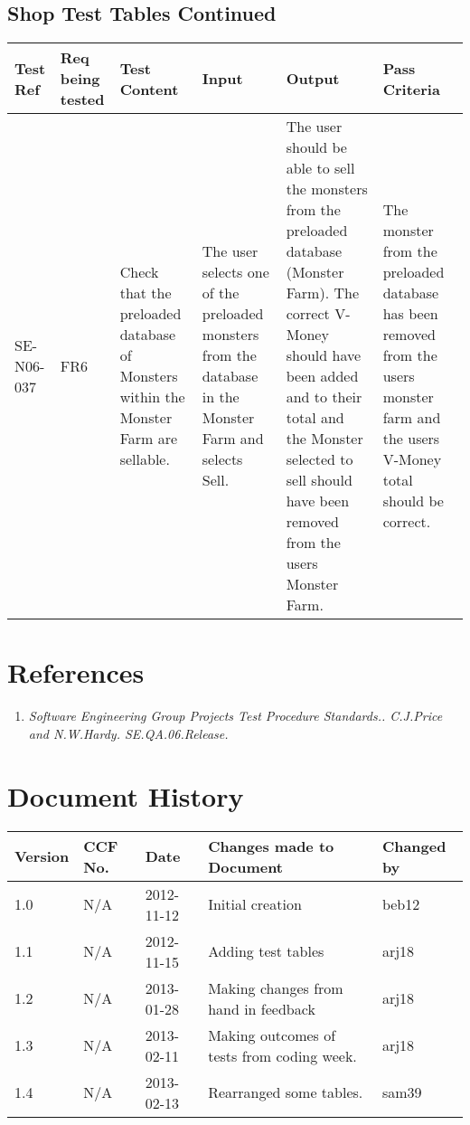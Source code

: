 \documentclass[titlepage]{article}
\begin{document}
\subsection{Shop Test Tables Continued}
\begin{tabular}{|p{1cm}|p{1cm}|p{2cm}|p{3cm}|p{3cm}|p{3cm}|}
\hline
Test Ref & Req being tested & Test Content & Input & Output & Pass Criteria \\ 
\hline
SE-N06-037 & FR6 & Check that the preloaded database of Monsters within the Monster Farm are sellable. & The user selects one of the preloaded monsters from the database in the Monster Farm and selects Sell. & The user should be able to sell the monsters from the preloaded database (Monster Farm). The correct V-Money should have been added and to their total and the Monster selected to sell should have been removed from the users Monster Farm. & The monster from the preloaded database has been removed from the users monster farm and the users V-Money total should be correct.\\
\hline
\end{tabular}
\newpage
\section{References}
\begin{enumerate}
\item \textit{Software Engineering Group Projects Test Procedure Standards.. C.J.Price and N.W.Hardy. SE.QA.06.Release.}
\end{enumerate}
\section{Document History}
\begin{tabular}{| l | l | l | l | l |} 
\hline 
Version & CCF No. & Date & Changes made to Document & Changed by \\ 
\hline 
1.0 & N/A & 2012-11-12 & Initial creation & beb12 \\ 
\hline 
1.1 & N/A & 2012-11-15 & Adding test tables & arj18 \\
\hline
1.2 & N/A & 2013-01-28 & Making changes from hand in feedback & arj18 \\
\hline
1.3 & N/A & 2013-02-11 & Making outcomes of tests from coding week. & arj18 \\
\hline
1.4 & N/A & 2013-02-13 & Rearranged some tables. & sam39 \\
\hline
\end{tabular} 
\end{document}
